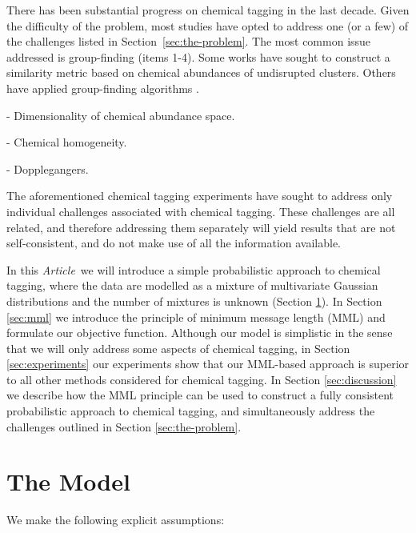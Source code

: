 \documentclass{aastex61}
\newcommand{\article}{\emph{Article}}
\begin{document}
There has been substantial progress on chemical tagging in the last decade.
Given the difficulty of the problem, most studies have opted to address one
(or a few) of the challenges listed in Section~\ref{sec:the-problem}. 
The most common issue addressed is group-finding (items 1-4). 
Some works have sought to construct a similarity metric \citep{Mitschang}
based on chemical abundances of undisrupted clusters. 
Others have applied group-finding algorithms \citep{Hogg,Gregor}.

- Dimensionality of chemical abundance space.

- Chemical homogeneity.

- Dopplegangers.


The aforementioned chemical tagging experiments have sought to address only 
individual challenges associated with chemical tagging.
These challenges are all related, and therefore addressing them separately
will yield results that are not self-consistent, and do not make use of all
the information available.


In this \article\ we will introduce a simple probabilistic approach to
chemical tagging, where the data are modelled as a mixture of multivariate
Gaussian distributions and the number of mixtures is unknown (Section 
\ref{sec:the-model}). 
In Section \ref{sec:mml} we introduce the principle of minimum message length
(MML) and formulate our objective function.
Although our model is simplistic in the sense that we will only address some
aspects of chemical tagging, in Section \ref{sec:experiments} our experiments
show that our MML-based approach is superior to all other methods considered 
for chemical tagging.
In Section \ref{sec:discussion} we describe how the MML principle can be used
to construct a fully consistent probabilistic approach to chemical tagging,
and simultaneously address the challenges outlined in Section 
\ref{sec:the-problem}.



\section{The Model}
\label{sec:the-model}

We make the following explicit assumptions:
\end{document}
